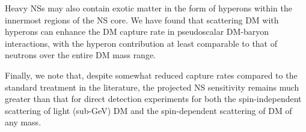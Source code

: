 Heavy NSs may also contain exotic matter in the form of hyperons within the innermost regions of the NS core. We have found that scattering DM with hyperons can enhance the DM capture rate in pseudoscalar DM-baryon interactions, with the hyperon contribution at least comparable to that of neutrons over the entire DM mass range.

Finally, we note that, despite somewhat reduced capture rates compared to the standard treatment in the literature, the projected NS sensitivity remains much greater than that for direct detection experiments for both the spin-independent scattering of light (sub-GeV) DM and the spin-dependent scattering of DM of any mass.  
